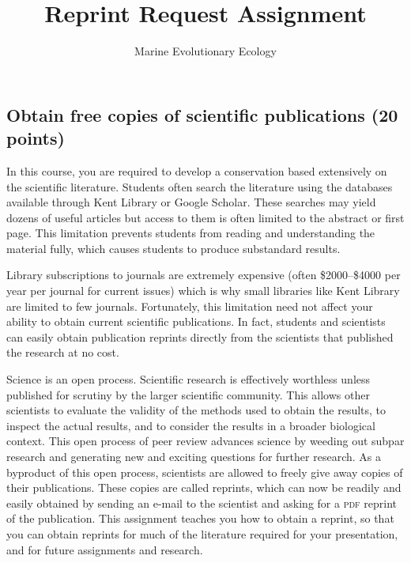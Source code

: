 \documentclass[12pt]{article}
\title{Reprint Request Assignment}
\author{Marine Evolutionary Ecology}
\date{}                                           %
\begin{document}
\thispagestyle{plain}


\subsection*{Obtain free copies of scientific publications (20 points)}

In this course, you are required
to develop a conservation based extensively on the
scientific literature. Students often search the literature using the
databases available through Kent Library or Google Scholar. These
searches may yield dozens of useful  articles but access to them is often limited to the abstract or first page. This limitation
prevents students from reading and understanding the material fully, 
which causes students to produce substandard results.

Library subscriptions to journals are extremely expensive (often \$2000--\$4000
per year per journal for current issues) which is why small
libraries like Kent Library are limited to few journals.
Fortunately, this limitation need not affect your ability to obtain
current scientific publications. In fact, students and scientists can
easily obtain publication reprints directly from the scientists that
published the research at no cost.

Science is an open process. Scientific research is effectively worthless
unless published for scrutiny by the larger scientific community. This
allows other scientists to evaluate the validity of the methods used to
obtain the results, to inspect the actual results, and to consider the
results in a broader biological context. This open process of peer
review advances science by weeding out subpar research and generating
new and exciting questions for further research. As a byproduct of this
open process, scientists are allowed to freely give away copies of their
publications. These copies are called reprints, which can now be readily
and easily obtained by sending an e-mail to the scientist and asking for
a \textsc{pdf} reprint of the publication.  This assignment teaches you how to obtain a reprint, so that you can
obtain reprints for much of the literature required for your
presentation, and for future assignments and research.
\end{document}
